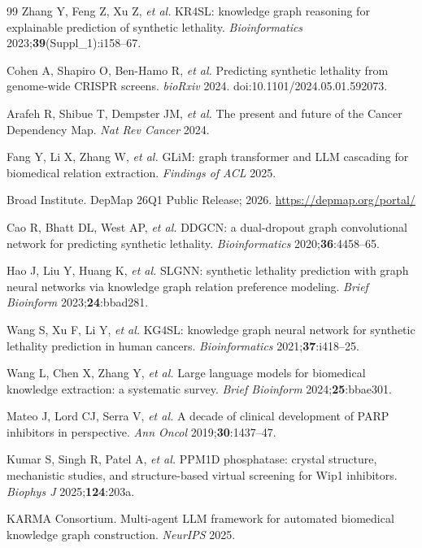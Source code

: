 \documentclass[12pt,a4paper]{article}
\begin{document}
\begin{thebibliography}{99}
Zhang Y, Feng Z, Xu Z, \textit{et al.}
KR4SL: knowledge graph reasoning for explainable prediction of synthetic lethality.
\textit{Bioinformatics} 2023;\textbf{39}(Suppl\_1):i158--67.

Cohen A, Shapiro O, Ben-Hamo R, \textit{et al.}
Predicting synthetic lethality from genome-wide CRISPR screens.
\textit{bioRxiv} 2024. doi:10.1101/2024.05.01.592073.

Arafeh R, Shibue T, Dempster JM, \textit{et al.}
The present and future of the Cancer Dependency Map.
\textit{Nat Rev Cancer} 2024.

Fang Y, Li X, Zhang W, \textit{et al.}
GLiM: graph transformer and LLM cascading for biomedical relation extraction.
\textit{Findings of ACL} 2025.

Broad Institute.
DepMap 26Q1 Public Release; 2026. \url{https://depmap.org/portal/}

Cao R, Bhatt DL, West AP, \textit{et al.}
DDGCN: a dual-dropout graph convolutional network for predicting synthetic lethality.
\textit{Bioinformatics} 2020;\textbf{36}:4458--65.

Hao J, Liu Y, Huang K, \textit{et al.}
SLGNN: synthetic lethality prediction with graph neural networks via knowledge graph relation preference modeling.
\textit{Brief Bioinform} 2023;\textbf{24}:bbad281.

Wang S, Xu F, Li Y, \textit{et al.}
KG4SL: knowledge graph neural network for synthetic lethality prediction in human cancers.
\textit{Bioinformatics} 2021;\textbf{37}:i418--25.

Wang L, Chen X, Zhang Y, \textit{et al.}
Large language models for biomedical knowledge extraction: a systematic survey.
\textit{Brief Bioinform} 2024;\textbf{25}:bbae301.

Mateo J, Lord CJ, Serra V, \textit{et al.}
A decade of clinical development of PARP inhibitors in perspective.
\textit{Ann Oncol} 2019;\textbf{30}:1437--47.

Kumar S, Singh R, Patel A, \textit{et al.}
PPM1D phosphatase: crystal structure, mechanistic studies, and structure-based virtual screening for Wip1 inhibitors.
\textit{Biophys J} 2025;\textbf{124}:203a.

KARMA Consortium.
Multi-agent LLM framework for automated biomedical knowledge graph construction.
\textit{NeurIPS} 2025.


\end{thebibliography}
\end{document}
